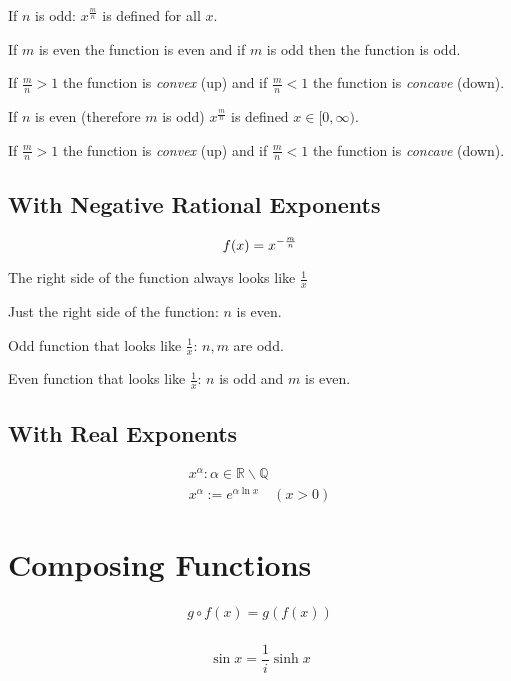 \documentclass[00_complete]{subfiles}
\begin{document}
If $n$ is odd: $x^{\frac{m}{n}}$ is defined for all $x$.

If $m$ is even the function is even and if $m$ is odd then the function is odd.

If $\frac{m}{n} > 1$ the function is \emph{convex} (up) and if $\frac{m}{n} < 1$ the
function is \emph{concave} (down).

If $n$ is even (therefore $m$ is odd) $x^{\frac{m}{n}}$ is defined $x \in [0, \infty)$.

If $\frac{m}{n} > 1$ the function is \emph{convex} (up) and if $\frac{m}{n} < 1$ the
function is \emph{concave} (down).

\subsection{With Negative Rational Exponents}

$$
    f(x)=x^{-\frac{m}{n}} \\
$$

The right side of the function always looks like $\frac{1}{x}$

Just the right side of the function: $n$ is even.

Odd function that looks like $\frac{1}{x}$: $n,m$ are odd.

Even function that looks like $\frac{1}{x}$: $n$ is odd and $m$ is even.

\subsection{With Real Exponents}

$$\begin{gathered}
    x^\alpha : \alpha \in \mathbb{R} \backslash \mathbb{Q} \\
    x^\alpha := e^{\alpha \ln x} \quad (x > 0)
\end{gathered}
$$

\section{Composing Functions}

$$
\begin{gathered}
    g \circ f(x) = g(f(x)) \\
\end{gathered}
$$

\begin{note}
$$
\sin x  = \frac{1}{i}\sinh x
$$
\end{note}
\end{document}
